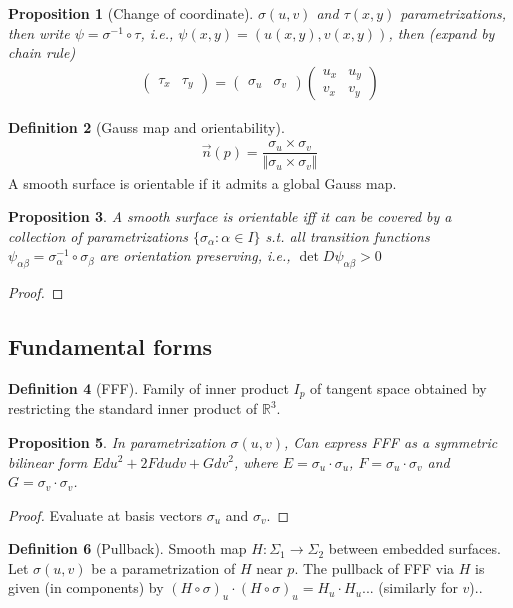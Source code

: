 \documentclass{article}
\theoremstyle{definition}
\newtheorem{defn}{Definition}[section]
\theoremstyle{remark}
\theoremstyle{plain}
\newtheorem{prop}[defn]{Proposition}
\theoremstyle{definition}
\newcommand{\RR}{\mathbb{R}}
\begin{document}
\begin{prop}[Change of coordinate]
    $\sigma(u,v)$ and $\tau(x,y)$ parametrizations, then write $\psi=\sigma^{-1}\circ\tau$, i.e., $\psi(x,y)=(u(x,y),v(x,y))$, then (expand by chain rule)
    \begin{align*}
        \begin{pmatrix}
            \tau_x & \tau_y
        \end{pmatrix}=\begin{pmatrix}
            \sigma_u & \sigma_v
        \end{pmatrix}\begin{pmatrix}
            u_x & u_y\\
            v_x & v_y
        \end{pmatrix}
    \end{align*}
\end{prop}
\begin{defn}[Gauss map and orientability]
    \begin{align*}
        \vec n(p)=\dfrac{\sigma_u\times\sigma_v}{\Vert\sigma_u\times\sigma_v\Vert}
    \end{align*}
    A smooth surface is orientable if it admits a global Gauss map.
\end{defn}
\begin{prop}
    A smooth surface is orientable iff it can be covered by a collection of parametrizations $\{\sigma_\alpha:\alpha\in I\}$ s.t. all transition functions $\psi_{\alpha\beta}=\sigma_\alpha^{-1}\circ\sigma_\beta$ are orientation preserving, i.e., $\det D\psi_{\alpha\beta}>0$
\end{prop}
\begin{proof}
    
\end{proof}

\subsection{Fundamental forms}
\begin{defn}[FFF]
    Family of inner product $I_p$ of tangent space obtained by restricting the standard inner product of $\RR^3$.
\end{defn}
\begin{prop}
    In parametrization $\sigma(u,v)$, Can express FFF as a symmetric bilinear form $Edu^2+2Fdudv+Gdv^2$, where $E=\sigma_u\cdot\sigma_u$, $F=\sigma_u\cdot \sigma_v$ and $G=\sigma_v\cdot\sigma_v$.
\end{prop}
\begin{proof}
    Evaluate at basis vectors $\sigma_u$ and $\sigma_v$.
\end{proof}
\begin{defn}[Pullback]
    Smooth map $H:\Sigma_1\to \Sigma_2$ between embedded surfaces. Let $\sigma(u,v)$ be a parametrization of $H$ near $p$. The pullback of FFF via $H$ is given (in components) by $(H\circ\sigma)_u\cdot (H\circ\sigma)_u=H_u\cdot H_u$... (similarly for $v$)..
\end{defn}
\end{document}
